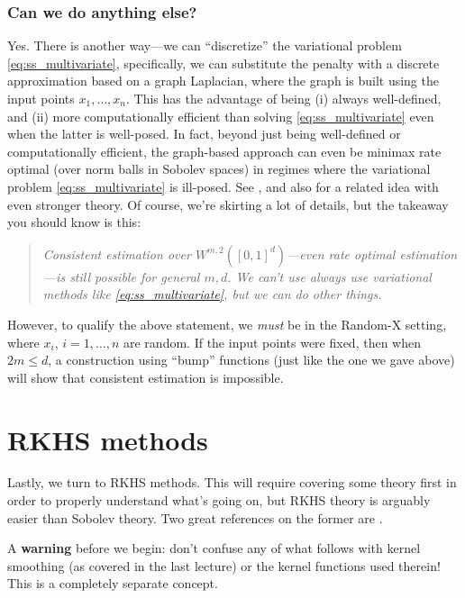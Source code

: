 \documentclass{article}
\begin{document}
\subsubsection{Can we do anything else?}

Yes. There is another way---we can ``discretize'' the variational problem 
\eqref{eq:ss_multivariate}, specifically, we can substitute the penalty with a
discrete approximation based on a graph Laplacian, where the graph is built 
using the input points $x_1,\dots,x_n$. This has the advantage of being (i)
always well-defined, and (ii) more computationally efficient than solving
\eqref{eq:ss_multivariate} even when the latter is well-posed. In fact, beyond
just being well-defined or computationally efficient, the graph-based approach
can even be minimax rate optimal (over norm balls in Sobolev spaces) in regimes
where the variational problem \eqref{eq:ss_multivariate} is ill-posed. See
\citet{green2021minimax}, and also \citet{green2023minimax} for a related idea
with even stronger theory. Of course, we're skirting a lot of details, but the
takeaway you should know is this:    
\begin{quote}
\centering\it
Consistent estimation over $W^{m,2}([0,1]^d)$---even rate optimal
estimation---is still possible for general $m,d$. We can't use always use
variational methods like \eqref{eq:ss_multivariate}, but we can do other things.     
\end{quote}
However, to qualify the above statement, we \emph{must} be in the Random-X
setting, where $x_i$, $i=1,\dots,n$ are random. If the input points were fixed,
then when $2m \leq d$, a construction using ``bump'' functions (just like the 
one we gave above) will show that consistent estimation is impossible. 

\section{RKHS methods}

Lastly, we turn to RKHS methods. This will require covering some theory first in
order to properly understand what's going on, but RKHS theory is arguably easier
than Sobolev theory. Two great references on the former are
\citet{scholkopf2002learning, christmann2008support}.  

A \textbf{warning} before we begin: don't confuse any of what follows with
kernel smoothing (as covered in the last lecture) or the kernel functions used
therein! This is a completely separate concept. 
\end{document}
